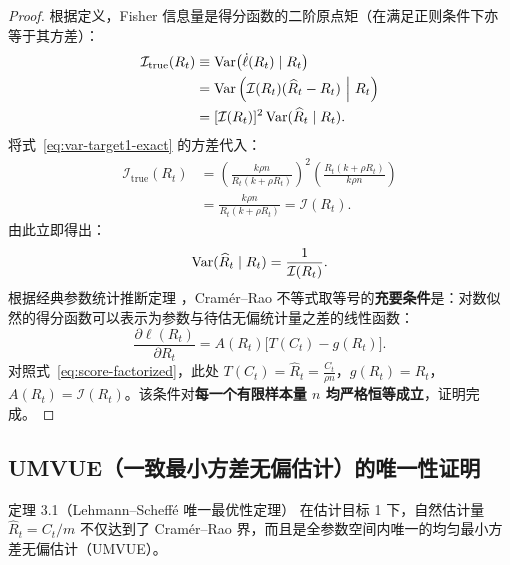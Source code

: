 \begin{proof}
根据定义，Fisher 信息量是得分函数的二阶原点矩（在满足正则条件下亦等于其方差）：
\begin{align}
  \mathcal{I}_{\text{true}}(R_t) &\equiv \mathrm{Var}\big(\dot{\ell}(R_t) \mid R_t\big) \nonumber \\
  &= \mathrm{Var}\left( \mathcal{I}(R_t)(\widehat{R}_t - R_t) \ \Big|\ R_t \right) \nonumber \\
  &= [\mathcal{I}(R_t)]^2 \, \mathrm{Var}(\widehat{R}_t \mid R_t).
\end{align}
将式~\eqref{eq:var-target1-exact} 的方差代入：
\begin{align}
  \mathcal{I}_{\text{true}}(R_t) &= \left( \frac{k\rho n}{R_t(k + \rho R_t)} \right)^2 \left( \frac{R_t(k + \rho R_t)}{k\rho n} \right) \nonumber \\
  &= \frac{k\rho n}{R_t(k + \rho R_t)} = \mathcal{I}(R_t).
\end{align}
由此立即得出：
\begin{equation}
  \mathrm{Var}(\widehat{R}_t \mid R_t) = \frac{1}{\mathcal{I}(R_t)}.
\end{equation}
根据经典参数统计推断定理 \citep{casella2002statistical}，Cramér--Rao 不等式取等号的\textbf{充要条件}是：对数似然的得分函数可以表示为参数与待估无偏统计量之差的线性函数：
\begin{equation}
  \frac{\partial \ell(R_t)}{\partial R_t} = A(R_t) \big[ T(C_t) - g(R_t) \big].
\end{equation}
对照式~\eqref{eq:score-factorized}，此处 $T(C_t) = \widehat{R}_t = \frac{C_t}{\rho n}$，$g(R_t) = R_t$，$A(R_t) = \mathcal{I}(R_t)$。该条件对\textbf{每一个有限样本量 $n$ 均严格恒等成立}，证明完成。
\end{proof}

\subsection{UMVUE（一致最小方差无偏估计）的唯一性证明}

\begin{theorembox}{定理 3.1（Lehmann--Scheffé 唯一最优性定理）}
在估计目标 1 下，自然估计量 $\widehat{R}_t = C_t/m$ 不仅达到了 Cramér--Rao 界，而且是全参数空间内唯一的均匀最小方差无偏估计（UMVUE）。
\end{theorembox}

